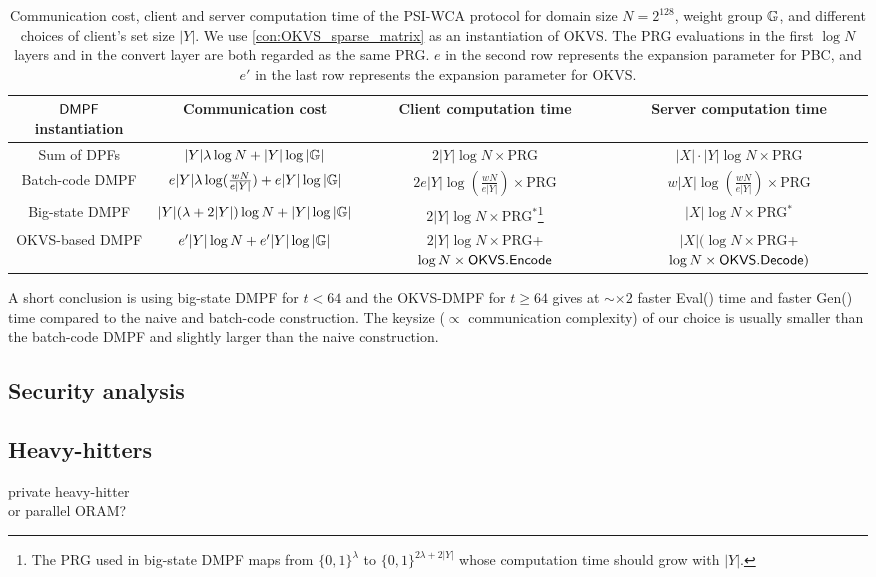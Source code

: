 \begin{table*}
  \renewcommand\arraystretch{1.5}
  \caption{Communication cost, client and server computation time of the PSI-WCA protocol for domain size $N = 2^{128}$, weight group $\mathbb{G}$, and  different choices of client's set size $|Y|$. We use \cref{con:OKVS_sparse_matrix} as an instantiation of OKVS. The PRG evaluations in the first $\log N$ layers and in the convert layer are both regarded as the same PRG. $e$ in the second row represents the expansion parameter for PBC, and $e'$ in the last row represents the expansion parameter for OKVS. }
\label{tab:PSI_plug_in_formula}
  \begin{tabular}{cccc}
          \toprule
    ${\sf DMPF}$ instantiation & Communication cost & Client computation time & Server computation time \\
          \midrule

          Sum of DPFs & $|Y|\lambda\log N+|Y|\log|\mathbb{G}|$ & $2|Y|\log N\times $PRG & $|X|\cdot |Y|\log N\times $PRG\\

          Batch-code DMPF & $e|Y|\lambda\log(\frac{wN}{e|Y|})+e|Y|\log|\mathbb{G}|$ & $2e|Y|\log(\frac{wN}{e|Y|})\times$PRG & $w|X|\log(\frac{wN}{e|Y|})\times$PRG\\

          Big-state DMPF & $|Y|(\lambda+2|Y|)\log N+|Y|\log|\mathbb{G}|$ & $2|Y|\log N\times $PRG$^*$\footnote{The PRG used in big-state DMPF maps from $\{0,1\}^\lambda$ to $\{0,1\}^{2\lambda+2|Y|}$ whose computation time should grow with $|Y|$. } & $|X|\log N \times$PRG$^*$\\

          OKVS-based DMPF& $e'|Y|\log N +e'|Y|\log|\mathbb{G}|$ & $2|Y|\log N\times$PRG+$\log N\times {\sf OKVS}.{\sf Encode}$ & $|X|(\log N\times$PRG+$\log N\times {\sf OKVS}.{\sf Decode})$\\
          \bottomrule
  \end{tabular}
\end{table*}



A short conclusion is using big-state DMPF for $t<64$ and the OKVS-DMPF for $t\ge 64$ gives at $\sim \times 2$ faster Eval() time and faster Gen() time compared to the naive and batch-code construction. The keysize ($\propto$ communication complexity) of our choice is usually smaller than the batch-code DMPF and slightly larger than the naive construction. 
\subsection{Security analysis}
\subsection{Heavy-hitters}
private heavy-hitter\\
or parallel ORAM?